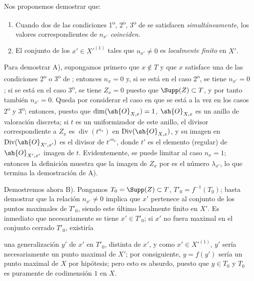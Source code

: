 \begin{env}[21.10.2]
\label{IV.21.10.2}
Nos proponemos demostrar que:
\begin{enumerate}[label=\Alph*)]
  \item Cuando dos de las condiciones 1\textsuperscript{o}, 2\textsuperscript{o}, 3\textsuperscript{o} de  se satisfacen \emph{simultáneamente}, los valores correspondientes de $n_{x'}$ \emph{coinciden}.
  \item El conjunto de los $x'\in X'^{(1)}$ tales que $n_{x'}\neq0$ es \emph{localmente finito} en $X'$.
\end{enumerate}

Para demostrar A), supongamos primero que $x\notin T$ y que $x$ satisface una de las condiciones 2\textsuperscript{o} o 3\textsuperscript{o} de ;
entonces $n_x=0$ y, si se está en el caso 2\textsuperscript{o}, se tiene $n_{x'}=0$;
si se está en el caso 3\textsuperscript{o}, se tiene $Z_x=0$ puesto que $\Supp(Z)\subset T$, y por tanto también $n_{x'}=0$.
Queda por considerar el caso en que se está a la vez en los casos 2\textsuperscript{o} y 3\textsuperscript{o};
entonces, puesto que $\dim(\sh{O}_{X,x})=1$, $\sh{O}_{X,x}$ es un anillo de valoración discreta;
si $t$ es un uniformizador de este anillo, el divisor correspondiente a $Z_x$ es $\operatorname{div}(t^{n_x})$ en $\operatorname{Div}(\sh{O}_{X,x})$, y su imagen en $\operatorname{Div}(\sh{O}_{X',x'})$ es el divisor de $t'^{n_x}$, donde $t'$ es el elemento (regular) de $\sh{O}_{X',x'}$ imagen de $t$.
Evidentemente, se puede limitar al caso $n_x=1$; entonces la definición  muestra que la imagen de $Z_x$ por  es el número $\lambda_{x'}$, lo que termina la demostración de A).

Demostremos ahora B).
Pongamos $T_0=\Supp(Z)\subset T$, $T'_0=f^{-1}(T_0)$;
basta demostrar que la relación $n_{x'}\neq0$ implica que $x'$ pertenece al conjunto de los puntos maximales de $T'_0$, siendo este último localmente finito en $X'$.
Es inmediato que necesariamente se tiene $x'\in T'_0$;
si $x'$ no fuera maximal en el conjunto cerrado $T'_0$, existiría

una generalización $y'$ de $x'$ en $T'_0$, distinta de $x'$, y como $x'\in X'^{(1)}$, $y'$ sería 
necesariamente un punto maximal de $X'$;
por consiguiente, $y=f(y')$ sería un punto maximal de $X$ por hipótesis;
pero esto es absurdo, puesto que $y\in T_0$ y $T_0$ es puramente de codimensión $1$ en $X$.
\end{env}


